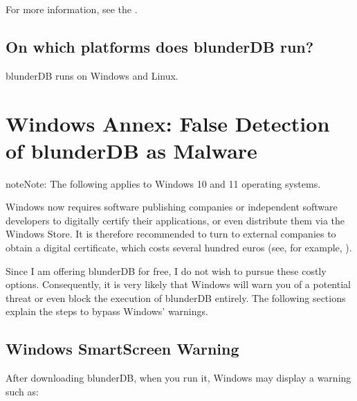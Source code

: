 \documentclass[letterpaper,10pt,english]{sphinxmanual}
\begin{document}
\sphinxAtStartPar
For more information, see the .


\subsection{On which platforms does blunderDB run?}
\label{\detokenize{faq:sur-quelles-plateformes-blunderdb-fonctionne-t-il}}
\sphinxAtStartPar
blunderDB runs on Windows and Linux.

\sphinxstepscope


\section{Windows Annex: False Detection of blunderDB as Malware}
\label{\detokenize{annexe_windows_securite:annexe-windows-detection-abusive-de-blunderdb-comme-logiciel-malveillant}}\label{\detokenize{annexe_windows_securite:annexe-windows-malware}}\label{\detokenize{annexe_windows_securite::doc}}
\begin{sphinxadmonition}{note}{Note:}
\sphinxAtStartPar
The following applies to Windows 10 and 11 operating systems.
\end{sphinxadmonition}

\sphinxAtStartPar
Windows now requires software publishing companies or independent software developers to digitally certify their applications, or even distribute them via the Windows Store. It is therefore recommended to turn to external companies to obtain a digital certificate, which costs several hundred euros (see, for example, ).

\sphinxAtStartPar
Since I am offering blunderDB for free, I do not wish to pursue these costly options. Consequently, it is very likely that Windows will warn you of a potential threat or even block the execution of blunderDB entirely. The following sections explain the steps to bypass Windows’ warnings.


\subsection{Windows SmartScreen Warning}
\label{\detokenize{annexe_windows_securite:avertissement-windows-smartscreen}}
\sphinxAtStartPar
After downloading blunderDB, when you run it, Windows may display a warning such as:
\end{document}
